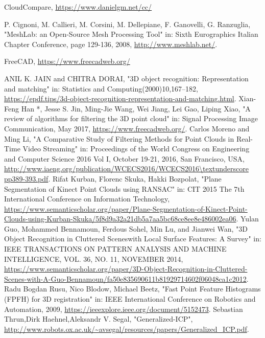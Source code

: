 \begin{thebibliography}{1}
		CloudCompare,
		\url{https://www.danielgm.net/cc/}

		P. Cignoni, M. Callieri, M. Corsini, M. Dellepiane, F. Ganovelli, G. Ranzuglia,
		"MeshLab: an Open-Source Mesh Processing Tool" in: Sixth Eurographics Italian Chapter Conference, page 129-136, 2008, \url{http://www.meshlab.net/}.

		FreeCAD,
		\url{https://www.freecadweb.org/}

		ANIL K. JAIN and CHITRA DORAI,
		"3D object recognition: Representation and matching" in: Statistics and Computing(2000)10,167–182, \url{https://epdf.tips/3d-object-recognition-representation-and-matching.html}.
		Xian-Feng Han *, Jesse S. Jin, Ming-Jie Wang, Wei Jiang, Lei Gao, Liping Xiao,
		"A review of algorithms for filtering the 3D point cloud" in: Signal Processing Image Communication, May 2017, \url{https://www.freecadweb.org/}.
		Carlos Moreno and Ming Li,
		"A Comparative Study of Filtering Methods for Point Clouds in Real-Time Video Streaming" in: Proceedings of the World Congress on Engineering and Computer Science 2016 Vol I, October 19-21, 2016, San Francisco, USA, \url{http://www.iaeng.org/publication/WCECS2016/WCECS2016\textunderscore pp389-393.pdf}.
		Rifat Kurban, Florenc Skuka, Hakki Bozpolat,
		"Plane Segmentation of Kinect Point Clouds using RANSAC" in: CIT 2015 The 7th International Conference on Information Technology, \url{https://www.semanticscholar.org/paper/Plane-Segmentation-of-Kinect-Point-Clouds-using-Kurban-Skuka/5f8d9a32a21db5a7aa5bc68ce8ee8e486002ea06}.
		Yulan Guo, Mohammed Bennamoun, Ferdous Sohel, Min Lu, and Jianwei Wan,
		"3D Object Recognition in Cluttered Sceneswith Local Surface Features: A Survey" in: IEEE TRANSACTIONS ON PATTERN ANALYSIS AND MACHINE INTELLIGENCE,  VOL. 36,  NO. 11,  NOVEMBER 2014, \url{https://www.semanticscholar.org/paper/3D-Object-Recognition-in-Cluttered-Scenes-with-A-Guo-Bennamoun/fa50e835690611b81929714602f06048ca1c2012}.
		Radu Bogdan Rusu, Nico Blodow, Michael Beetz,
		"Fast Point Feature Histograms (FPFH) for 3D registration" in: IEEE International Conference on Robotics and Automation, 2009, \url{https://ieeexplore.ieee.org/document/5152473}.
		Sebastian Thrun,Dirk Haehnel,Aleksandr V. Segal,
		"Generalized-ICP", \url{http://www.robots.ox.ac.uk/~avsegal/resources/papers/Generalized_ICP.pdf}.	
\end{thebibliography}

